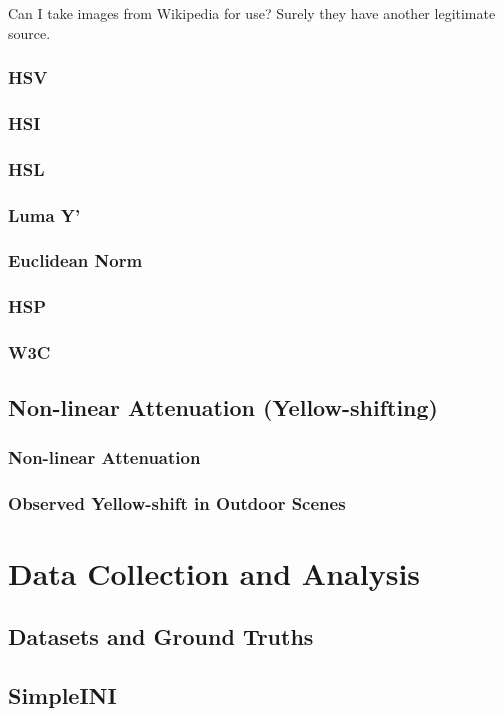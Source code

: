 \documentclass[12pt]{report}
\begin{document}
Can I take images from Wikipedia for use? Surely they have another legitimate source.

\subsubsection{HSV}
\subsubsection{HSI}
\subsubsection{HSL}
\subsubsection{Luma Y'}
\subsubsection{Euclidean Norm}
\subsubsection{HSP}
\subsubsection{W3C}

\subsection{Non-linear Attenuation (Yellow-shifting)}
\subsubsection{Non-linear Attenuation}
\subsubsection{Observed Yellow-shift in Outdoor Scenes}

\section{Data Collection and Analysis}
\subsection{Datasets and Ground Truths}
\subsection{SimpleINI}
\end{document}
